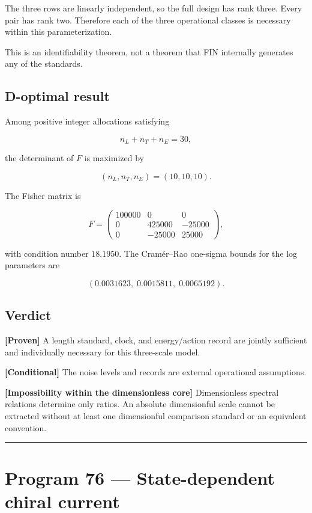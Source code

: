 \documentclass[11pt,a4paper,openany]{report}
\newcommand{\statusProven}{\textcolor{fingreen}{[Proven]}}
\newcommand{\statusConditional}{\textcolor{finorange}{[Conditional]}}
\begin{document}
The three rows are linearly independent, so the full design has rank three. Every pair has rank two. Therefore each of the three operational classes is necessary within this parameterization.

This is an identifiability theorem, not a theorem that FIN internally generates any of the standards.

\section{D-optimal result}

Among positive integer allocations satisfying

\[
n_L+n_T+n_E=30,
\]

the determinant of \(F\) is maximized by

\[
(n_L,n_T,n_E)=(10,10,10).
\]

The Fisher matrix is

\[
F=
\begin{pmatrix}
100000&0&0\\
0&425000&-25000\\
0&-25000&25000
\end{pmatrix},
\]

with condition number \(18.1950\). The Cramér--Rao one-sigma bounds for the log parameters are

\[
(0.0031623,\;0.0015811,\;0.0065192).
\]

\section{Verdict}

\textbf{\statusProven{}} A length standard, clock, and energy/\allowbreak{}action record are jointly sufficient and individually necessary for this three-scale model.

\textbf{\statusConditional{}} The noise levels and records are external operational assumptions.

\textbf{[Impossibility within the dimensionless core]} Dimensionless spectral relations determine only ratios. An absolute dimensionful scale cannot be extracted without at least one dimensionful comparison standard or an equivalent convention.

\par\medskip\hrule\medskip

\chapter{Program 76 --- State-dependent chiral current}
\end{document}
